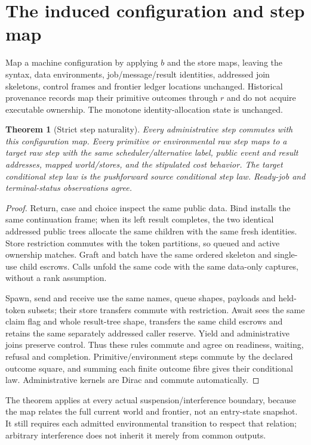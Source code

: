 \documentclass[11pt]{article}
\newtheorem{theorem}{Theorem}\newtheorem{definition}{Definition}\newtheorem{proposition}{Proposition}
\begin{document}
\section{The induced configuration and step map}
Map a machine configuration by applying $b$ and the store maps, leaving the syntax, data environments, job/message/result identities, addressed join skeletons, control frames and frontier ledger locations unchanged. Historical provenance records map their primitive outcomes through $r$ and do not acquire executable ownership. The monotone identity-allocation state is unchanged.

\begin{theorem}[Strict step naturality]\label{maps-step}
Every administrative step commutes with this configuration map. Every primitive or environmental raw step maps to a target raw step with the same scheduler/alternative label, public event and result addresses, mapped world/stores, and the stipulated cost behavior. The target conditional step law is the pushforward source conditional step law. Ready-job and terminal-status observations agree.
\end{theorem}
\begin{proof}
Return, case and choice inspect the same public data. Bind installs the same continuation frame; when its left result completes, the two identical addressed public trees allocate the same children with the same fresh identities. Store restriction commutes with the token partitions, so queued and active ownership matches. Graft and batch have the same ordered skeleton and single-use child escrows. Calls unfold the same code with the same data-only captures, without a rank assumption.

Spawn, send and receive use the same names, queue shapes, payloads and held-token subsets; their store transfers commute with restriction. Await sees the same claim flag and whole result-tree shape, transfers the same child escrows and retains the same separately addressed caller reserve. Yield and administrative joins preserve control. Thus these rules commute and agree on readiness, waiting, refusal and completion. Primitive/environment steps commute by the declared outcome square, and summing each finite outcome fibre gives their conditional law. Administrative kernels are Dirac and commute automatically.
\end{proof}

The theorem applies at every actual suspension/interference boundary, because the map relates the full current world and frontier, not an entry-state snapshot. It still requires each admitted environmental transition to respect that relation; arbitrary interference does not inherit it merely from common outputs.
\end{document}
